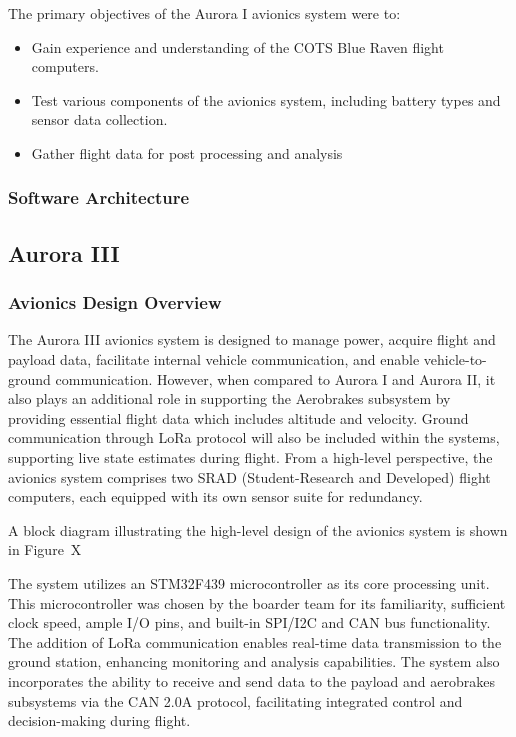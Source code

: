 The primary objectives of the Aurora I avionics system were to: 
\begin{itemize}
  \item Gain experience and understanding of the COTS Blue Raven flight computers. 
  \item Test various components of the avionics system, including battery types and sensor data collection. 
  \item Gather flight data for post processing and analysis
\end{itemize}

\subsubsection{Software Architecture}

\subsection{Aurora III}
\subsubsection{Avionics Design Overview}
The Aurora III avionics system is designed to manage power, acquire flight and payload data, facilitate internal vehicle communication, and enable vehicle-to-ground communication. However, when compared to Aurora I and Aurora II, it also plays an additional role in supporting the Aerobrakes subsystem by providing essential flight data which includes altitude and velocity. Ground communication through LoRa protocol will also be included within the systems, supporting live state estimates during flight. From a high-level perspective, the avionics system comprises two SRAD (Student-Research and Developed) flight computers, each equipped with its own sensor suite for redundancy. 

A block diagram illustrating the high-level design of the avionics system is shown in Figure~X

The system utilizes an STM32F439 microcontroller as its core processing unit. This microcontroller was chosen by the boarder team for its familiarity, sufficient clock speed, ample I/O pins, and built-in SPI/I2C and CAN bus functionality. The addition of LoRa communication enables real-time data transmission to the ground station, enhancing monitoring and analysis capabilities. The system also incorporates the ability to receive and send data to the payload and aerobrakes subsystems via the CAN 2.0A protocol, facilitating integrated control and decision-making during flight. 

